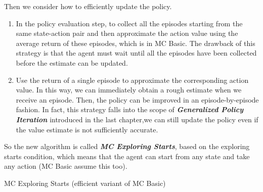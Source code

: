 \documentclass[10pt]{elegantbook}
\newcommand{\mydefination}[1]{\textbf{\textit{\textcolor{structurecolor}{#1}}}}
\begin{document}
Then we consider how to efficiently update the policy.
\begin{enumerate}
    \item In the policy evaluation step, to collect all the episodes starting from the same state-action pair and then approximate the action value using the
average return of these episodes, which is in MC Basic. The drawback of this strategy is that the agent must wait until all the episodes have
been collected before the estimate can be updated.
    \item Use the return of a single episode to approximate the corresponding action value. In this way, we can
immediately obtain a rough estimate when we receive an episode. Then, the policy can be improved in an episode-by-episode fashion. In fact, this strategy
falls into the scope of \mydefination{Generalized Policy Iteration} introduced in the last chapter,we can still update the policy even if the value estimate is not sufficiently accurate.
\end{enumerate}

So the new algorithm is called \mydefination{MC Exploring Starts}, based on the exploring starts condition, which means that the agent can start from any state 
and take any action (MC Basic assume this too).

\begin{algorithm}[H]
\caption{MC Exploring Starts (efficient variant of MC Basic)}

\end{algorithm}
\end{document}
